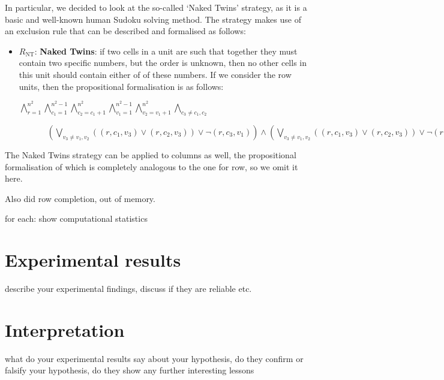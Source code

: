 \documentclass[10pt,a4paper,leqno]{article}
\newcommand{\lp}{\left(}
\newcommand{\rp}{\right)}
\begin{document}
In particular, we decided to look at the so-called `Naked Twins' strategy, as it is a basic and well-known human Sudoku solving method. The strategy makes use of an exclusion rule that can be described and formalised as follows:

\begin{itemize}

\item $ R_{\text{NT}}$: \textbf{Naked Twins}: if two cells in a unit are such that together they must contain two specific numbers, but the order is unknown, then no other cells in this unit should contain either of of these numbers. If we consider the row units, then the propositional formalisation is as follows: 
 
$\bigwedge_{r=1}^{n^2} \bigwedge_{c_1=1}^{n^2-1}\bigwedge_{c_2=c_1 + 1}^{n^2} \bigwedge_{v_1=1}^{n^2 - 1} \bigwedge_{v_2=v_1 + 1}^{n^2} \bigwedge_{c_3 \neq c_1,c_2} $

$\;\;\;\;\;\;\;\;\;\;\;\; \lp \bigvee_{v_3 \neq v_1,v_2} \lp (r,c_1,v_3) \lor (r,c_2,v_3)\rp \lor \neg (r,c_3,v_1) \rp 
\wedge
\lp \bigvee_{v_3 \neq v_1,v_2} \lp (r,c_1,v_3) \lor (r,c_2,v_3)\rp \lor \neg (r,c_3,v_2) \rp 
$


\end{itemize}


The Naked Twins strategy can be applied to columns as well, the propositional formalisation of which is completely analogous to the one for row, so we omit it here. 





Also did row completion, out of memory. 



for each: show computational statistics 
 
 
 
 
\section*{Experimental results}

 describe your experimental findings, discuss if they are reliable etc.

\section*{Interpretation}

 what do your experimental results say about your hypothesis, do they confirm or falsify your hypothesis, do they show any further interesting lessons
\end{document}
